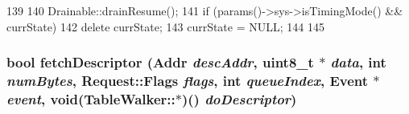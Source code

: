 \begin{DoxyCode}
139 {
140     Drainable::drainResume();
141     if (params()->sys->isTimingMode() && currState) {
142         delete currState;
143         currState = NULL;
144     }
145 }
\end{DoxyCode}
\hypertarget{classArmISA_1_1TableWalker_a583b81ca3090f4eb8014ec261cadeb6e}{
\subsubsection[{fetchDescriptor}]{\setlength{\rightskip}{0pt plus 5cm}bool fetchDescriptor ({\bf Addr} {\em descAddr}, \/  uint8\_\-t $\ast$ {\em data}, \/  int {\em numBytes}, \/  {\bf Request::Flags} {\em flags}, \/  int {\em queueIndex}, \/  Event $\ast$ {\em event}, \/  void(TableWalker::$\ast$)() {\em doDescriptor})}}
\label{classArmISA_1_1TableWalker_a583b81ca3090f4eb8014ec261cadeb6e}



